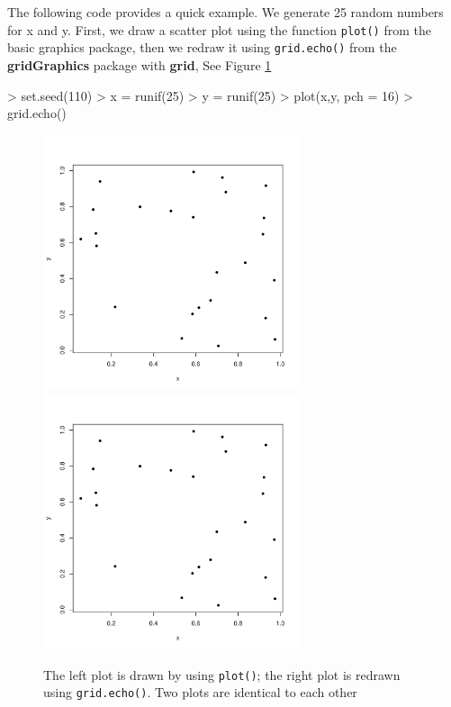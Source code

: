 \documentclass{report}
\begin{document}
The following code provides a quick example. We generate 25 random numbers for x and y. First, we draw a scatter plot using the function \texttt{plot()} from the basic graphics package, then we redraw it using \texttt{grid.echo()} from the \textbf{gridGraphics} package with \textbf{grid}, See Figure \ref{figure_1.1}
\begin{Schunk}
\begin{Sinput}
> set.seed(110)
> x = runif(25)
> y = runif(25)
> plot(x,y, pch = 16)
> grid.echo()
\end{Sinput}
\end{Schunk}

\begin{figure}[h]
	\begin{center}
		\includegraphics[height = 7.5cm, width = 7.5cm]{figure/report_basic_demo_1.pdf}
		\includegraphics[height = 7.5cm, width = 7.5cm]{figure/report_basic_demo_1.pdf}
		\caption{The left plot is drawn by using \texttt{plot()}; the right plot is redrawn using \texttt{grid.echo()}. Two plots are identical to each other}
		\label{figure_1.1}
	\end{center}
\end{figure}
\end{document}

